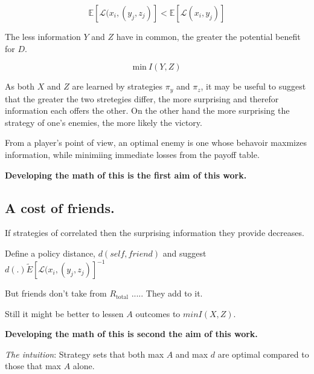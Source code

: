 \documentclass[8pt]{article}
\begin{document}
\begin{equation}
    \mathbb E [\mathcal{L}(x_i,(y_j, z_j)] < \mathbb E [\mathcal{L}(x_i,y_j)] 
\end{equation}

The less information $Y$ and $Z$ have in common, the greater the potential benefit for $D$.

\begin{equation}
    \text{min} \ I(Y,Z)
\end{equation}

As both $X$ and $Z$ are learned by strategies $\pi_y$ and $\pi_z$, it may be useful to suggest that the greater the two stretegies differ, the more surprising and therefor information each offers the other. On the other hand the more surprising the strategy of one's enemies, the more likely the victory. 

From a player's point of view, an optimal enemy is one whose behavoir maxmizes information, while minimiing immediate losses from the payoff table. 

\textbf{Developing the math of this is the first aim of this work.}


\subsection*{A cost of friends.}
If strategies of correlated then the surprising information they provide decreases. 

Define a policy distance, $d(self, friend)$ and suggest $d(.) \tilde E [\mathcal{L}(x_i,(y_j, z_j)]^{-1}$

But friends don't take from $R_\text{total}$ ..... They add to it.

Still it might be better to lessen $A$ outcomes to $ min I(X,Z)$. 

\textbf{Developing the math of this is second the aim of this work.}

\textit{The intuition}: Strategy sets that both max $A$ and max $d$ are optimal compared to those that max $A$ alone.


\end{document}
